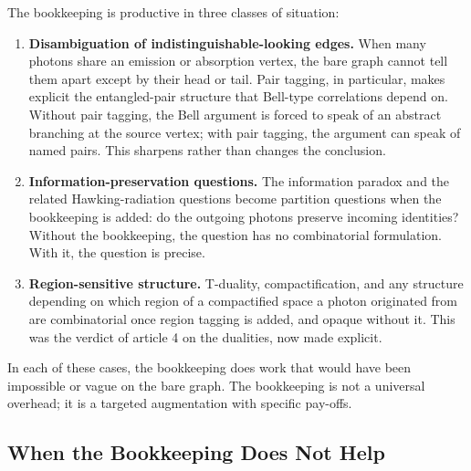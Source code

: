 \documentclass[11pt]{article}
\begin{document}
The bookkeeping is productive in three classes of situation:
\begin{enumerate}
    \item \textbf{Disambiguation of indistinguishable-looking edges.} When many photons share an emission or absorption vertex, the bare graph cannot tell them apart except by their head or tail. Pair tagging, in particular, makes explicit the entangled-pair structure that Bell-type correlations depend on. Without pair tagging, the Bell argument is forced to speak of an abstract branching at the source vertex; with pair tagging, the argument can speak of named pairs. This sharpens rather than changes the conclusion.
    \item \textbf{Information-preservation questions.} The information paradox and the related Hawking-radiation questions become partition questions when the bookkeeping is added: do the outgoing photons preserve incoming identities? Without the bookkeeping, the question has no combinatorial formulation. With it, the question is precise.
    \item \textbf{Region-sensitive structure.} T-duality, compactification, and any structure depending on which region of a compactified space a photon originated from are combinatorial once region tagging is added, and opaque without it. This was the verdict of article 4 on the dualities, now made explicit.
\end{enumerate}
In each of these cases, the bookkeeping does work that would have been impossible or vague on the bare graph. The bookkeeping is not a universal overhead; it is a targeted augmentation with specific pay-offs.

\subsection{When the Bookkeeping Does Not Help}
\end{document}
